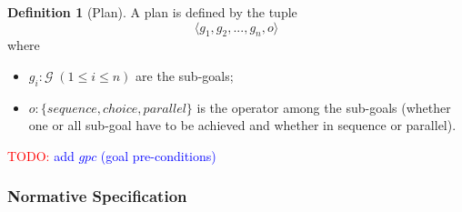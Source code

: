 \documentclass{article}
\newcommand{\todo}[1]{\textcolor{red}{TODO: }\textcolor{blue}{#1}}
\newcommand{\set}[1]{\mathcal{#1}}
\theoremstyle{definition} \newtheorem{definition}{Definition}
\begin{document}
\begin{definition}[Plan]
  A plan is defined by the tuple
 \begin{displaymath}
    \langle g_1, g_2, ..., g_n, o \rangle    
  \end{displaymath}
  where 
  \begin{itemize}
  \item $g_i : \set{G} \; (1 \leq i \leq n)$ are the sub-goals;
  \item $o : \{ sequence, choice, parallel\}$ is the operator among
    the sub-goals (whether one or all sub-goal have to be achieved and
    whether in sequence or parallel).
\end{itemize}  
\end{definition}

\todo{add $gpc$ (goal pre-conditions)}

\subsubsection{Normative Specification}
\end{document}
